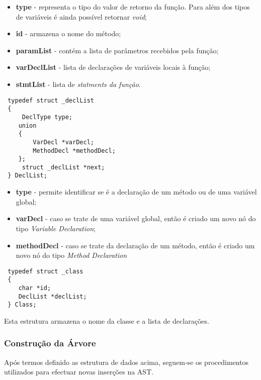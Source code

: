 \documentclass[11pt,a4paper]{article}
\begin{document}
\begin{itemize}
    \item \textbf{type} - representa o tipo do valor de retorno da função. Para além dos tipos de variáveis é ainda possível retornar \textit{void};
    \item \textbf{id} - armazena o nome do método;
    \item \textbf{paramList} - contém a lista de parâmetros recebidos pela função;
    \item \textbf{varDeclList} - lista de declarações de variáveis locais à função;
    \item \textbf{stmtList} - lista de \textit{statments da função}.
\end{itemize}

\begin{lstlisting}
 typedef struct _declList
 {
     DeclType type;
 	union
 	{
 		VarDecl *varDecl;
 		MethodDecl *methodDecl;
 	};
     struct _declList *next;
 } DeclList;
\end{lstlisting}

\vspace{0.3cm}

\begin{itemize}
    \item \textbf{type} - permite identificar se é a declaração de um método ou de uma variável global;
    \item \textbf{varDecl} - caso se trate de uma variável global, então é criado um novo nó do tipo \textit{Variable Declaration};
    \item \textbf{methodDecl} - caso se trate da declaração de um método, então é criado um novo nó do tipo \textit{Method Declaration}
\end{itemize}

\begin{lstlisting}
 typedef struct _class
 {
 	char *id;
 	DeclList *declList;
 } Class;
\end{lstlisting}

\vspace{0.3cm}

Esta estrutura armazena o nome da classe e a lista de declarações.

\subsubsection{Construção da Árvore}

Após termos definido as estrutura de dados acima, seguem-se os procedimentos utilizados para efectuar novas inserções na AST.
\end{document}
